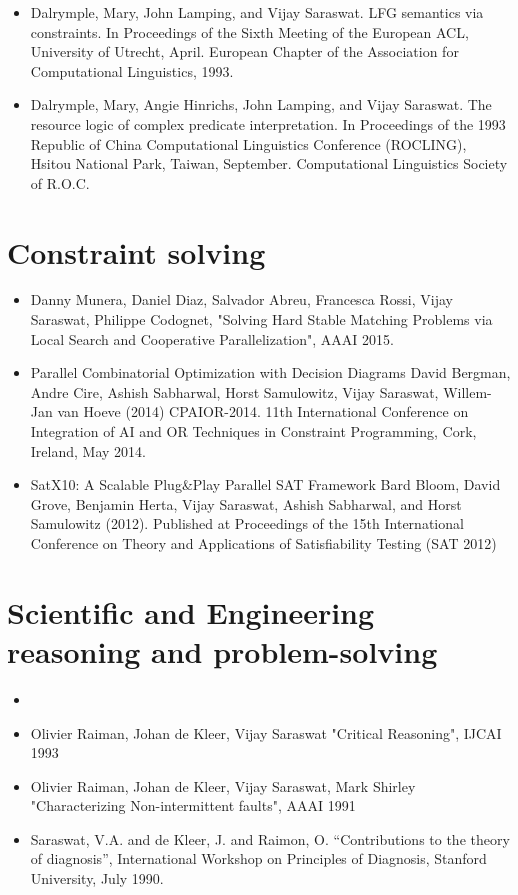 \documentclass{article}
\begin{document}
\begin{itemize}
\item Dalrymple, Mary, John Lamping, and Vijay Saraswat. 
    LFG semantics via constraints. In Proceedings of the Sixth
    Meeting of the European ACL, University of Utrecht, April.
    European Chapter of the Association for Computational
    Linguistics, 1993.
    
\item Dalrymple, Mary, Angie Hinrichs, John Lamping, and Vijay Saraswat.
    The resource logic of complex predicate interpretation.
    In Proceedings of the 1993 Republic of China Computational
    Linguistics Conference (ROCLING), Hsitou National Park,
    Taiwan, September. Computational Linguistics Society of R.O.C.

\end{itemize}

\section*{Constraint solving}
\begin{itemize}
\item Danny Munera, Daniel Diaz, Salvador Abreu, Francesca Rossi, Vijay
Saraswat, Philippe Codognet,  "Solving Hard Stable Matching Problems
via Local Search and Cooperative Parallelization", AAAI 2015.

\item Parallel Combinatorial Optimization with Decision Diagrams
David Bergman, Andre Cire, Ashish Sabharwal, Horst Samulowitz, Vijay
Saraswat, Willem-Jan van Hoeve (2014)  CPAIOR-2014. 11th International
Conference on Integration of AI and OR Techniques in Constraint
Programming, Cork, Ireland, May 2014.  

\item SatX10: A Scalable Plug\&Play Parallel SAT Framework 
Bard Bloom, David Grove, Benjamin Herta, Vijay Saraswat, Ashish
Sabharwal, and Horst Samulowitz (2012).  Published at Proceedings of
the 15th International Conference on Theory and Applications of
Satisfiability Testing (SAT 2012)   
\end{itemize}

\section*{Scientific and Engineering reasoning and problem-solving}

\begin{itemize}
\item 
\item Olivier Raiman, Johan de Kleer, Vijay Saraswat "Critical Reasoning",
IJCAI 1993 

\item Olivier Raiman, Johan de Kleer, Vijay Saraswat, Mark Shirley
"Characterizing Non-intermittent faults", AAAI 1991

\item Saraswat, V.A. and de Kleer, J. and Raimon, O.
  ``Contributions to the theory of diagnosis'', International
  Workshop on Principles of Diagnosis, Stanford University, July
  1990.
\end{itemize}
\end{document}
